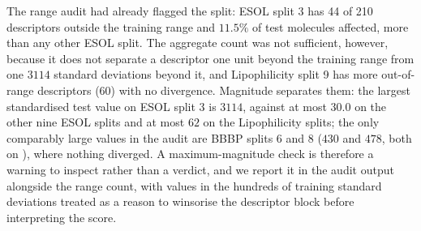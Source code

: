 The range audit had already flagged the split: ESOL split 3 has 44 of 210 descriptors outside the training range and $11.5\%$ of test molecules affected, more than any other ESOL split. The aggregate count was not sufficient, however, because it does not separate a descriptor one unit beyond the training range from one $3114$ standard deviations beyond it, and Lipophilicity split 9 has more out-of-range descriptors (60) with no divergence. Magnitude separates them: the largest standardised test value on ESOL split 3 is $3114$, against at most $30.0$ on the other nine ESOL splits and at most $62$ on the Lipophilicity splits; the only comparably large values in the audit are BBBP splits 6 and 8 ($430$ and $478$, both on ), where nothing diverged. A maximum-magnitude check is therefore a warning to inspect rather than a verdict, and we report it in the audit output alongside the range count, with values in the hundreds of training standard deviations treated as a reason to winsorise the descriptor block before interpreting the score.


